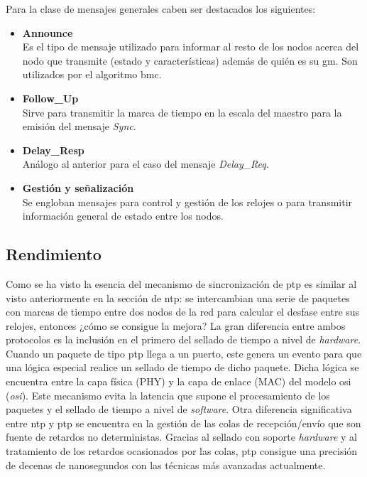 Para la clase de mensajes generales caben ser destacados los siguientes:

\begin{itemize}
	\item \textbf{Announce} \\
	Es el tipo de mensaje utilizado para informar al resto de los nodos acerca 
	del nodo que transmite (estado y características) además de quién es su 
	\gls{gm}. Son utilizados por el algoritmo \gls{bmc}.
	
	\item \textbf{Follow\_Up} \\
	Sirve para transmitir la marca de tiempo en la escala del maestro para la 
	emisión del mensaje \textit{Sync}.
	
	\item \textbf{Delay\_Resp} \\
	Análogo al anterior para el caso del mensaje \textit{Delay\_Req}.
	
	\item \textbf{Gestión y señalización} \\
	Se engloban mensajes para control y gestión de los relojes o para 
	transmitir información general de estado entre los nodos.
	
\end{itemize}


\subsection{Rendimiento}

Como se ha visto la esencia del mecanismo de sincronización de \gls{ptp} es 
similar al visto anteriormente en la sección de \gls{ntp}: se intercambian una 
serie de paquetes con marcas de tiempo entre dos nodos de la red para calcular 
el desfase entre sus relojes, entonces ¿cómo se consigue la mejora? La gran 
diferencia entre ambos protocolos es la inclusión en el primero del sellado de 
tiempo a nivel de \textit{hardware}. Cuando un paquete de tipo \gls{ptp} llega 
a un puerto, este genera un evento para que una lógica especial realice un 
sellado de tiempo de dicho paquete. Dicha lógica se encuentra entre la capa 
física (PHY) y la capa de enlace (MAC) del modelo \acrshort{osi} 
(\textit{\acrlong{osi}}). Este mecanismo evita la latencia que supone el 
procesamiento de los paquetes y el sellado de tiempo a nivel de 
\textit{software}. Otra diferencia significativa entre \gls{ntp} y \gls{ptp} se 
encuentra en la gestión de las colas de recepción/envío que son fuente de 
retardos no deterministas. Gracias al sellado con soporte \textit{hardware} y 
al tratamiento de los retardos ocasionados por las colas, \gls{ptp} consigue 
una precisión de decenas de nanosegundos con las técnicas más avanzadas 
actualmente. 



